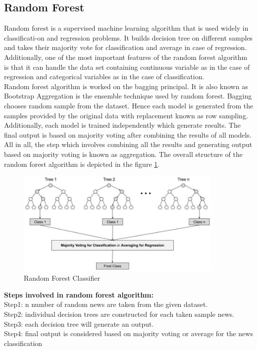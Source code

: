 \subsection{Random Forest}
Random forest is a supervised machine learning algorithm that is used widely in classificati-on and regression problems. It builds decision tree on different samples and takes their majority vote for classification and average in case of regression. Additionally, one of the most important features of the random forest algorithm is that it can handle the data set containing continuous variable as in the case of regression and categorical variables as in the case of classification.\\
Random forest algorithm is worked on the bagging principal. It is also known as Bootstrap Aggregation is the ensemble technique used by random forest. Bagging chooses random sample from the dataset. Hence each model is generated from the samples provided by the original data with replacement known as row sampling. Additionally, each model is trained independently which generate results. The final output is based on majority voting after combining the results of all models. All in all, the step which involves combining all the results and generating output based on majority voting is known as aggregation. The overall structure of the random forest algorithm is depicted in the figure \ref{fig:random_forest}.\\
\begin{figure}[H] 
	\centering 
	\vspace{20pt}\includegraphics[width=10cm]{images/randomforest.jpg}
	\caption{Random Forest Classifier}
	\label{fig:random_forest} 
\end{figure}
\textbf{Steps involved in random forest algorithm:}\\
Step1: n number of random news are taken from the given dataset.\\
Step2: individual decision trees are constructed for each taken sample news.\\
Step3: each decision tree will generate an output.\\
Step4: final output is considered based on majority voting or average for the news classification
